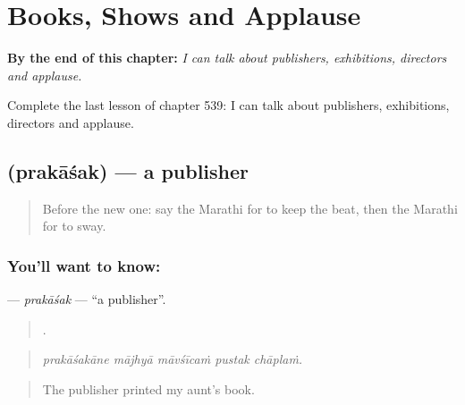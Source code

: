 
\chapter{Books, Shows and Applause}
\label{ch:mr-books-shows-and-applause}

\begin{chapteropening}
\textbf{By the end of this chapter:} \emph{I can talk about publishers, exhibitions, directors and applause.}

Complete the last lesson of chapter 539: I can talk about publishers, exhibitions, directors and applause.
\end{chapteropening}

\section[\texorpdfstring{\mr{प्रकाशक} (prakāśak)}{प्रकाशक (prakāśak)}]{ (prakāśak) — a publisher}

\label{lesson:MR-C539-prakasak}



\begin{quote}
Before the new one: say the Marathi for to keep the beat, then the Marathi for to sway.
\end{quote}

\subsection*{You'll want to know: }
\textbf{} — \emph{prakāśak} — \textquotedblleft{}a publisher\textquotedblright{}.

\begin{quote}
    .
\end{quote}

\begin{quote}
\emph{prakāśakāne mājhyā māvśīcaṁ pustak chāplaṁ.}
\end{quote}

\begin{quote}
The publisher printed my aunt's book.
\end{quote}

